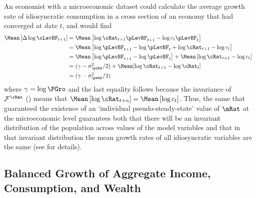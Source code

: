 \documentclass[BufferStockTheory]{subfiles}
\begin{document}
An economist with a microeconomic dataset could calculate the average growth rate of idiosyncratic consumption in a cross section of an economy that had converged at date $t$, and would find
\begin{align*}
  \Mean\left[\Delta \log \cLevBF_{t+1}\right]  & = \Mean\left[ \log {\cRat}_{t+1}\pLevBF_{t+1} - \log c_{t}\pLevBF_{t}\right]  \notag \\
                                               & = \Mean\left[ \log \pLevBF_{t+1}- \log \pLevBF_{t} + \log {\cRat}_{t+1} - \log c_{t}\right]  \notag \\
                                               & = \Mean\left[ \log \pLevBF_{t+1}- \log \pLevBF_{t}\right] + \Mean\left[ \log {\cRat}_{t+1} - \log c_{t}\right]  \notag \\
                                               & = (\gamma - \sigma^{2}_{\pshk}/2) + \Mean[\log \cRat_{t+1} - \log \cRat_{t}] \\
                                               & = (\gamma - \sigma^{2}_{\pshk}/2)
\end{align*}
where $\gamma=\log \PGro$ and the last equality follows because the invariance of
 $\mathcal{F}^{\cRat}$ (\cite{szeidlInvariant}) means that $\Mean\left[ \log
  {\cRat}_{t+n}\right] = \Mean\left[ \log
  c_{t}\right]$.  Thus, the same {\GIC} that guaranteed the existence of an `individual pseudo-steady-state' value of $\mRat$ at the microeconomic level guarantees both that there will be an invariant distribution of the population across values of the model variables and that in that invariant distribution the mean growth rates of all idiosyncratic variables are the same (see \cite{szeidlInvariant} for details).

\hypertarget{Growth-Rates-of-Aggregate-Income-and-Consumption}{}
\subsection{Balanced Growth of Aggregate Income, Consumption, and Wealth}
\label{subsec:cGroEqPGroQ}

\end{document}
